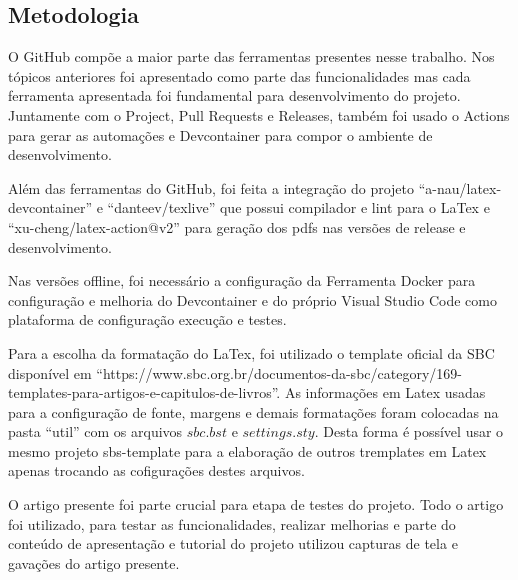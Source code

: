 \subsection{Metodologia}

O GitHub compõe a maior parte das ferramentas presentes nesse trabalho. Nos tópicos anteriores foi apresentado como parte das funcionalidades mas cada ferramenta apresentada foi fundamental para desenvolvimento do projeto. 
Juntamente com o Project, Pull Requests e Releases, também foi usado o Actions para gerar as automações e Devcontainer para compor o ambiente de desenvolvimento.

Além das ferramentas do GitHub, foi feita a integração do projeto ``a-nau/latex-devcontainer'' e ``danteev/texlive'' que possui compilador e lint para o LaTex e ``xu-cheng/latex-action@v2'' para geração dos pdfs nas versões de release e desenvolvimento.

Nas versões offline, foi necessário a configuração da Ferramenta Docker para configuração e melhoria do Devcontainer e do próprio Visual Studio Code como plataforma de configuração execução e testes.

Para a escolha da formatação do LaTex, foi utilizado o template oficial da SBC disponível em ``https://www.sbc.org.br/documentos-da-sbc/category/169-templates-para-artigos-e-capitulos-de-livros''. As informações em Latex usadas para a configuração de fonte, margens e demais formatações foram colocadas na pasta ``util'' com os arquivos $sbc.bst$ e $settings.sty$. Desta forma é possível usar o mesmo projeto sbs-template para a elaboração de outros tremplates em Latex apenas trocando as cofigurações destes arquivos.

O artigo presente foi parte crucial para etapa de testes do projeto. Todo o artigo foi utilizado, para testar as funcionalidades, realizar melhorias e parte do conteúdo de apresentação e tutorial do projeto utilizou capturas de tela e gavações do artigo presente.